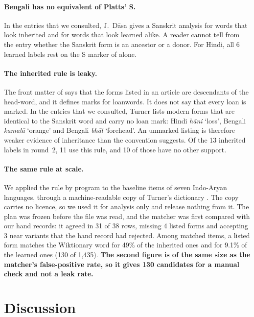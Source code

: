 \documentclass[11pt]{article}
\newcommand{\gl}[1]{`#1'}
\begin{document}
\paragraph{Bengali has no equivalent of Platts' S.} In the entries that we consulted, J.~D\=asa gives a Sanskrit analysis for words that look inherited and for words that look learned alike. A reader cannot tell from the entry whether the Sanskrit form is an ancestor or a donor. For Hindi, all 6 learned labels rest on the S marker of \citet{platts1884} alone.

\paragraph{The inherited rule is leaky.} The front matter of \citet{turner1966cdial} says that the forms listed in an article are descendants of the head-word, and it defines marks for loanwords. It does not say that every loan is marked. In the entries that we consulted, Turner lists modern forms that are identical to the Sanskrit word and carry no loan mark: Hindi \textit{h\=ani} \gl{loss}, Bengali \textit{kamal\=a} \gl{orange} and Bengali \textit{bh\=al} \gl{forehead}. An unmarked listing is therefore weaker evidence of inheritance than the convention suggests. Of the 13 inherited labels in round~2, 11 use this rule, and 10 of those have no other support.

\paragraph{The same rule at scale.} We applied the rule by program to the baseline items of seven Indo-Aryan languages, through a machine-readable copy of Turner's dictionary \citep{arora2023jambu}. The copy carries no licence, so we used it for analysis only and release nothing from it. The plan was frozen before the file was read, and the matcher was first compared with our hand records: it agreed in 31 of 38 rows, missing 4 listed forms and accepting 3 near variants that the hand record had rejected. Among matched items, a listed form matches the Wiktionary word for 49\% of the inherited ones and for 9.1\% of the learned ones (130 of 1,435). \textbf{The second figure is of the same size as the matcher's false-positive rate, so it gives 130 candidates for a manual check and not a leak rate.}

\section{Discussion}
\end{document}
